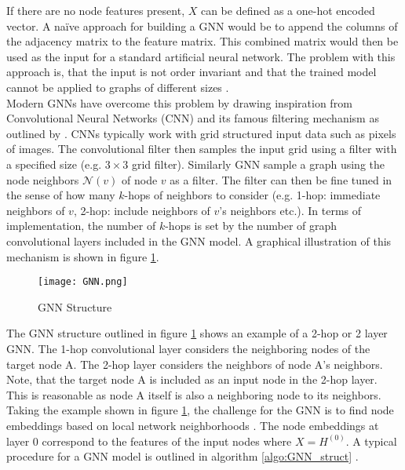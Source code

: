	\noindent If there are no node features present, $X$ can be defined as a 
	one-hot encoded vector. A naïve approach for building a GNN would be to
	append the columns of the adjacency matrix to the feature matrix. This
	combined matrix would then be used as the input for a standard
	artificial neural network. The problem with this approach is, that the 
	input is not order invariant and that the trained model cannot be applied 
	to graphs of different sizes \citep{leskovec2021lecture}. \\

	\noindent Modern GNNs have overcome this problem by drawing inspiration from 
	Convolutional Neural Networks (CNN) and its famous filtering mechanism as 
	outlined by \cite{krizhevsky2012imagenet}. CNNs typically work with grid 
	structured input data such as pixels of images. The convolutional filter 
	then samples the input grid using a filter with a specified size 
	(e.g. $3\times3$ grid filter). Similarly GNN sample a graph using the node 
	neighbors $\mathcal{N}(v)$ of node $v$ as a filter. The filter can then be 
	fine tuned in the sense of how many $k$-hops of neighbors to consider 
	(e.g. 1-hop: immediate neighbors of $v$, 2-hop: include neighbors of $v$'s 
	neighbors etc.). In terms of implementation, the number of $k$-hops is set 
	by the number of graph convolutional layers included in the GNN model. A 
	graphical illustration of this mechanism is shown in figure 
	\ref{fig:GNN_structure}. \\

	\begin{figure}
		\centering
		\texttt{[image: GNN.png]}
		\caption{GNN Structure}
		\cite{leskovec2021lecture}
		\label{fig:GNN_structure}
	\end{figure}

	\noindent The GNN structure outlined in figure \ref{fig:GNN_structure} 
	shows an example of a 2-hop or 2 layer GNN. The 1-hop convolutional layer 
	considers the neighboring nodes of the target node A. The 2-hop layer 
	considers the neighbors of node A's neighbors. Note, that the target node A 
	is included as an input node in the 2-hop layer. This is reasonable as node 
	A itself is also a neighboring node to its neighbors. Taking the example 
	shown in figure \ref{fig:GNN_structure}, the challenge for the GNN is to 
	find node embeddings based on local network neighborhoods \citep{leskovec2021lecture}. 
	The node embeddings at layer 0 correspond to the features of the input nodes 
	where $X = H^{(0)}$. A typical procedure for a GNN model is outlined in 
	algorithm \ref{algo:GNN_struct} 
	\citep{hamilton2017inductive,leskovec2021lecture,you2020design}.
	


